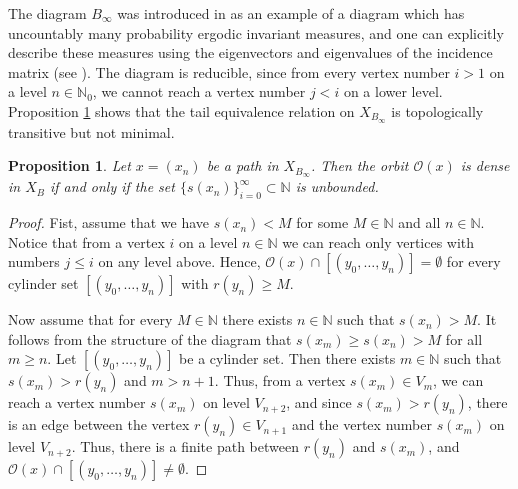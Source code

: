 \documentclass[11pt, twoside]{amsart}
\theoremstyle{definition}
\theoremstyle{remark}
\theoremstyle{plain}
\newtheorem{prop}[definition]{Proposition}
\newcommand{\tcr}{\textcolor{red}}
\newcommand{\N}{\mathbb N}
\numberwithin{equation}{section}
\begin{document}
\smallskip

The diagram $B_{\infty}$ was introduced in \cite[Section 8]{BezuglyiKarpelKwiatkowskiWata2024} as an example of a diagram which has uncountably many probability ergodic invariant measures, and one can explicitly describe these measures using the eigenvectors and eigenvalues of the incidence matrix (see \cite[Theorem 4.3]{BezuglyiKarpelKwiatkowski2024}). The diagram is reducible, since from every vertex number $i > 1$ on a level $n \in \N_0$, we cannot reach a vertex number $j < i$ on a lower level. Proposition \ref{prop:B_infty} shows that the tail equivalence relation on $X_{B_{\infty}}$ is topologically transitive but not minimal. 
\begin{prop}\label{prop:B_infty}
Let $x = (x_n)$ be a path in $X_{B_{\infty}}$. Then the orbit $\mathcal{O}(x)$ is dense in $X_B$ if and only if the set $\{s(x_n)\}_{i = 0}^{\infty} \subset \N$ is unbounded.
\end{prop}

\begin{proof}
Fist, assume that we have $s(x_n) < M$ for some $M \in \N$ and all $n \in \N$. Notice that from a vertex $i$ on a level $n \in \N$ we can reach only vertices with numbers $j \leq i$ on any level above. Hence, $\mathcal{O}(x) \cap [(y_0, \ldots, y_n)] = \emptyset$ for every cylinder set $[(y_0, \ldots, y_n)]$ with $r(y_n) \geq M$.

Now assume that for every $M \in \N$ there exists $n \in \N$ such that $s(x_n) > M$. 
It follows from the structure of the diagram that $s(x_m) \geq s(x_n) > M$ for all $m \geq n$. Let $[(y_0, \ldots, y_n)]$ be a cylinder set. Then there exists $m \in \N$ such that $s(x_m) > r(y_n)$ and $m > n + 1$. Thus, from a vertex $s(x_m) \in V_m$, we can reach a vertex number $s(x_m)$ on level $V_{n+2}$, and since $s(x_m) > r(y_n)$, there is an edge between the vertex $r(y_n) \in V_{n+1}$ and the vertex number $s(x_m)$ on level $V_{n+2}$. Thus, there is a finite path between $r(y_n)$ and $s(x_m)$, and $\mathcal{O}(x) \cap [(y_0, \ldots, y_n)] \neq \emptyset$.
\end{proof}

\end{document}
